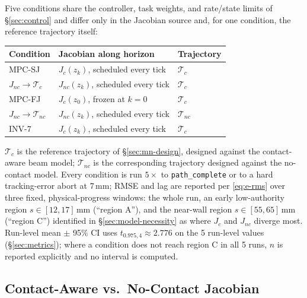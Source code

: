 \documentclass[journal]{IEEEtran}
\begin{document}
Five conditions share the controller, task weights, and rate/state
limits of \S\ref{sec:control} and differ only in the Jacobian source
and, for one condition, the reference trajectory itself:
\begin{center}
\begin{tabular}{@{}lll@{}}
\toprule
Condition & Jacobian along horizon & Trajectory \\
\midrule
MPC-SJ & $J_c(z_k)$, scheduled every tick & $\mathcal{T}_c$ \\
$J_{nc}\!\to\!\mathcal{T}_c$ & $J_{nc}(z_k)$, scheduled every tick & $\mathcal{T}_c$ \\
MPC-FJ & $J_c(z_0)$, frozen at $k{=}0$ & $\mathcal{T}_c$ \\
$J_{nc}\!\to\!\mathcal{T}_{nc}$ & $J_{nc}(z_k)$, scheduled every tick & $\mathcal{T}_{nc}$ \\
INV-7 & $J_c(z_k)$, scheduled every tick & $\mathcal{T}_c$ \\
\bottomrule
\end{tabular}
\end{center}
$\mathcal{T}_c$ is the reference trajectory of \S\ref{sec:mn-design},
designed against the contact-aware beam model; $\mathcal{T}_{nc}$ is
the corresponding trajectory designed against the no-contact model.
Every condition is run $5\times$ to \texttt{path\_complete} or to a
hard tracking-error abort at $7\,\mathrm{mm}$; RMSE and lag are
reported per \eqref{eq:e-rms} over three fixed, physical-progress
windows: the whole run, an early low-authority region
$s\in[12,17]\,\mathrm{mm}$ (``region A''), and the near-wall region
$s\in[55,65]\,\mathrm{mm}$ (``region C'') identified in
\S\ref{sec:model-necessity} as where $J_c$ and $J_{nc}$ diverge most.
Run-level mean $\pm$ 95\% CI uses $t_{0.975,4}\approx2.776$ on the 5
run-level values (\S\ref{sec:metrics}); where a condition does not
reach region C in all 5 runs, $n$ is reported explicitly and no
interval is computed.

\subsection{Contact-Aware vs.\ No-Contact Jacobian}
\label{sec:hw-exp1}
\end{document}
